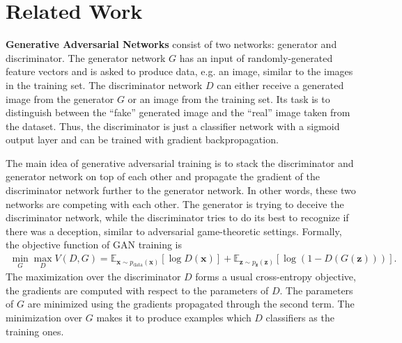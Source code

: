 \documentclass{article}
\begin{document}
\section{Related Work}
\label{sec:relatedwork}
{\bf Generative Adversarial Networks} consist of two networks: generator and discriminator. 
    The generator network $G$ has an
    input of randomly-generated feature vectors and is asked to produce data, e.g. an image, 
    similar to the images in the training set. The discriminator network $D$
    can either receive a generated image from the generator $G$ or an image
    from the training set. Its task is to distinguish
    between the ``fake'' generated image and the ``real'' image taken from the dataset. Thus,
    the discriminator is just a classifier network with a sigmoid output layer
    and can be trained with gradient backpropagation. 

    The main idea of generative adversarial
    training is to stack the discriminator and generator network on top of each other and propagate the gradient of the discriminator
    network further to the generator network. In other words, these two networks are competing with each other. The 
    generator is trying to deceive the discriminator network, while the discriminator tries
    to do its best to recognize if there was a deception, similar to adversarial game-theoretic settings.    
    Formally, the objective function of GAN training is
    \begin{align*}
        \min_G \max_D V(D, G) = \mathbb{E}_{\bm{x} \sim p_{\text{data}}(\bm{x})}[\log D(\bm{x})] + 
            \mathbb{E}_{\bm{z} \sim p_{\bm{z}}(\bm{z})}[\log (1 - D(G(\bm{z})))].
    \end{align*}
    The maximization over the discriminator $D$ forms a usual cross-entropy objective, the gradients are
    computed with respect to the parameters of $D$. The parameters of $G$ are minimized using the gradients
    propagated through the second term. The minimization over $G$ makes it to produce examples which $D$
    classifiers as the training ones.
    
\end{document}
